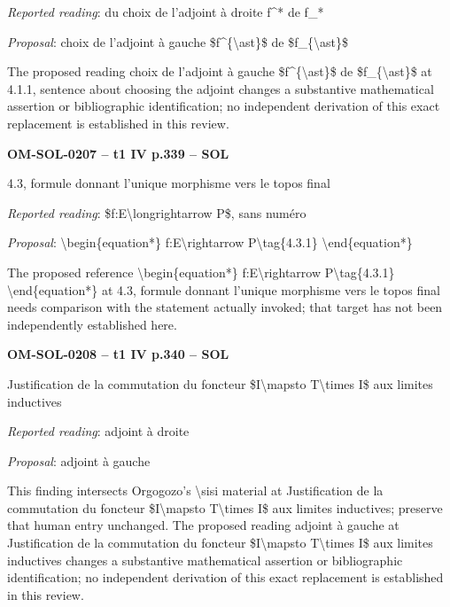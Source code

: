\emph{Reported reading}: du choix de l'adjoint à droite f\textasciicircum{}* de f\_*\par
\emph{Proposal}: choix de l'adjoint à gauche \$f\textasciicircum{}\{\textbackslash{}ast\}\$ de \$f\_\{\textbackslash{}ast\}\$\par
The proposed reading choix de l'adjoint à gauche \$f\textasciicircum{}\{\textbackslash{}ast\}\$ de \$f\_\{\textbackslash{}ast\}\$ at 4.1.1, sentence about choosing the adjoint changes a substantive mathematical assertion or bibliographic identification; no independent derivation of this exact replacement is established in this review.\par
\par\noindent\textbf{OM-SOL-0207 -- t1 IV p.339 -- SOL}\par
4.3, formule donnant l'unique morphisme vers le topos final\par
\emph{Reported reading}: \$f:E\textbackslash{}longrightarrow P\$, sans numéro\par
\emph{Proposal}: \textbackslash{}begin\{equation*\} f:E\textbackslash{}rightarrow P\textbackslash{}tag\{4.3.1\} \textbackslash{}end\{equation*\}\par
The proposed reference \textbackslash{}begin\{equation*\} f:E\textbackslash{}rightarrow P\textbackslash{}tag\{4.3.1\} \textbackslash{}end\{equation*\} at 4.3, formule donnant l'unique morphisme vers le topos final needs comparison with the statement actually invoked; that target has not been independently established here.\par
\par\noindent\textbf{OM-SOL-0208 -- t1 IV p.340 -- SOL}\par
Justification de la commutation du foncteur \$I\textbackslash{}mapsto T\textbackslash{}times I\$ aux limites inductives\par
\emph{Reported reading}: adjoint à droite\par
\emph{Proposal}: adjoint à gauche\par
This finding intersects Orgogozo's \textbackslash{}sisi material at Justification de la commutation du foncteur \$I\textbackslash{}mapsto T\textbackslash{}times I\$ aux limites inductives; preserve that human entry unchanged. The proposed reading adjoint à gauche at Justification de la commutation du foncteur \$I\textbackslash{}mapsto T\textbackslash{}times I\$ aux limites inductives changes a substantive mathematical assertion or bibliographic identification; no independent derivation of this exact replacement is established in this review.\par
